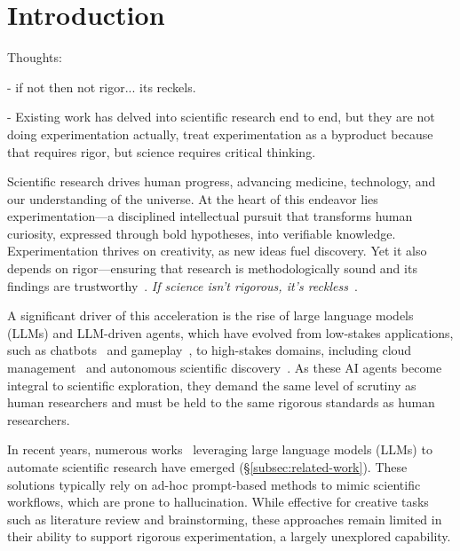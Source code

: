 \section{Introduction}
\label{sec:intro} 

Thoughts:

- if not then not rigor... its reckels.  

- Existing work has delved into scientific research end to end, but they are not doing experimentation actually, treat experimentation as a byproduct because that requires rigor, but science requires critical thinking. 
\fi

Scientific research drives human progress, advancing medicine, technology, and our understanding of the universe. 
At the heart of this endeavor lies experimentation—a disciplined intellectual pursuit that transforms human curiosity, expressed through bold hypotheses, into verifiable knowledge. 
Experimentation thrives on creativity, as new ideas fuel discovery. 
Yet it also depends on rigor—ensuring that research is methodologically sound and its findings are trustworthy~\cite{rigor2, rigor3}.
\textit{If science isn’t rigorous, it’s reckless}~\cite{rigor1}.

A significant driver of this acceleration is the rise of large language models (LLMs) and LLM-driven agents, which have evolved from low-stakes applications, such as chatbots~\cite{openai} and gameplay~\cite{voyager}, to high-stakes domains, including cloud management~\cite{cloud1, terrafault, lilac} and autonomous scientific discovery~\cite{zhang2024comprehensive,auto-science1,lu2024ai}. 
As these AI agents become integral to scientific exploration, they demand the same level of scrutiny as human researchers and must be held to the same rigorous standards as human researchers. 
\fi

In recent years, numerous works~\cite{zhang2024comprehensive,auto-science1,lu2024ai} leveraging large language models (LLMs) to automate scientific research have emerged (\S\ref{subsec:related-work}). 
These solutions typically rely on ad-hoc prompt-based methods to mimic scientific workflows, which are prone to hallucination.
While effective for creative tasks such as literature review and brainstorming, these approaches remain limited in their ability to support rigorous experimentation, a largely unexplored capability.

